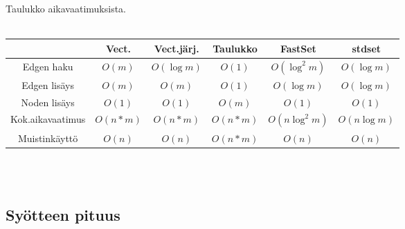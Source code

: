 \documentclass{article}
\begin{document}
        Taulukko aikavaatimuksista. \\ \\
        \begin{tabular}{c|c|c|c|c|c} \hline
                            &\textbf{Vect.}&\textbf{Vect.järj.}&\textbf{Taulukko}&\textbf{FastSet}&\textbf{stdset}\\ \hline
            Edgen haku      &$O(m)$        &$O(\log m)$        &$O(1)$           &$O(\log^2 m)$    &$O(\log m)$     \\ \hline
            Edgen lisäys    &$O(m)$        &$O(m)$             &$O(1)$           &$O(\log m)$      &$O(\log m)$     \\ \hline
            Noden lisäys    &$O(1)$        &$O(1)$             &$O(m)$           &$O(1)$          &$O(1)$         \\ \hline
            Kok.aikavaatimus&$O(n*m)$      &$O(n*m)$           &$O(n*m)$         &$O(n \log^2 m)$  &$O(n \log m)$   \\ \hline
            Muistinkäyttö   &$O(n)$        &$O(n)$             &$O(n*m)$         &$O(n)$          &$O(n)$         \\
        \end{tabular} \\ \\

        \newpage
        \subsection{Syötteen pituus}
        
\end{document}
